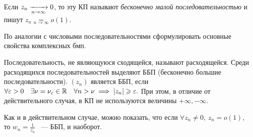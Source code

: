 \documentclass[../../main.tex]{subfiles}
\begin{document}
Если $ z_n \xrightarrow[n \rightarrow \infty]{} 0 $, то эту КП называют 
\emph{бесконечно 
малой последовательностью} и пишут $ z_n \underset{n \to \infty}{=} o(1) $.

\begin{exc}
	По аналогии с числовыми последовательностями сформулировать основные свойства 
	комплексных бмп.
\end{exc}

\medskip

Последовательность, не являющуюся сходящейся, называют расходящейся. Среди 
расходящихся последовательностей выделяют ББП (бесконечно большие 
последовательности).
$ (z_n) $ является ББП, если $ \forall \varepsilon > 0\quad \exists \nu = \nu_\varepsilon 
\in 
\mathbb{R}\quad \forall n > \nu \implies |z_n| \geqslant \varepsilon.$
При этом, в отличие от действительного случая, в КП не используются величины $ 
+\infty, -\infty $.

Как и в действительном случае, можно показать, что если $ \forall z_n \neq 
0,\ z_n = o(1) $, то $ w_n = \frac{1}{z_n} $ ~--- ББП, и наоборот.
\end{document}
